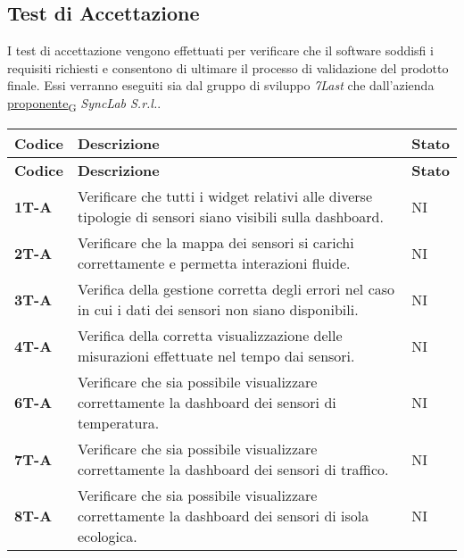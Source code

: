 \subsection{Test di Accettazione}
I test di accettazione vengono effettuati per verificare che il software soddisfi i requisiti richiesti e consentono di ultimare il processo di validazione del prodotto finale.
Essi verranno eseguiti sia dal gruppo di sviluppo \textit{7Last} che dall'azienda \href{https://7last.github.io/docs/rtb/documentazione-interna/glossario\#proponente}{proponente\textsubscript{G}} \textit{SyncLab S.r.l.}. \\
\begin{longtable}{|>{\raggedright\arraybackslash}m{}|>{\raggedright\arraybackslash}m{}|>{\raggedright\arraybackslash}m{}|}
	\hline
	\textbf{Codice} & \textbf{Descrizione}                                                                                                   & \textbf{Stato} \\
	\hline
	\endfirsthead
	\hline
	\textbf{Codice} & \textbf{Descrizione}                                                                                                   & \textbf{Stato} \\
	\endhead
	\textbf{1T-A}   & Verificare che tutti i widget relativi alle diverse tipologie di sensori siano visibili sulla dashboard.               & NI             \\
	\hline
	\textbf{2T-A}   & Verificare che la mappa dei sensori si carichi correttamente e permetta interazioni fluide.                            & NI             \\
	\hline
	\textbf{3T-A}   & Verifica della gestione corretta degli errori nel caso in cui i dati dei sensori non siano disponibili.                & NI             \\
	\hline
	\textbf{4T-A}   & Verifica della corretta visualizzazione delle misurazioni effettuate nel tempo dai sensori.                            & NI             \\
	\hline
	\textbf{6T-A}   & Verificare che sia possibile visualizzare correttamente la dashboard dei sensori di temperatura.                       & NI             \\
	\hline
	\textbf{7T-A}   & Verificare che sia possibile visualizzare correttamente la dashboard dei sensori di traffico.                          & NI             \\
	\hline
	\textbf{8T-A}   & Verificare che sia possibile visualizzare correttamente la dashboard dei sensori di isola ecologica.                   & NI             \\

\end{longtable}

